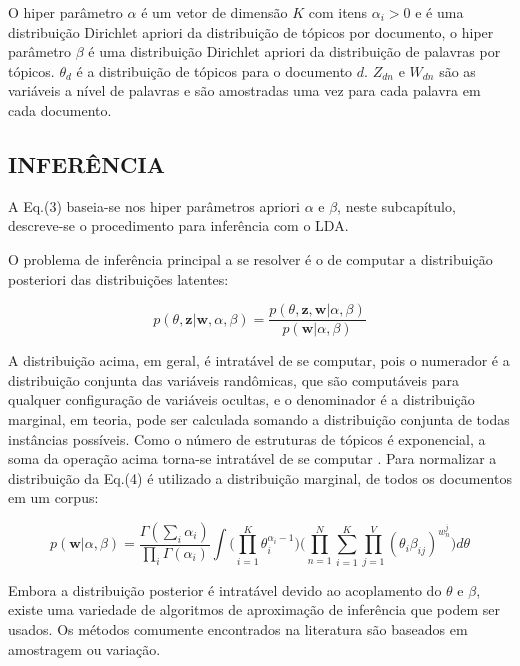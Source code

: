 \documentclass[12pt,a4paper]{article}
\begin{document}
O hiper parâmetro $\alpha$ é um vetor de dimensão $K$ com itens \(\alpha _i>0\) e é uma distribuição Dirichlet apriori da distribuição de tópicos por documento,
o hiper parâmetro $\beta$ é uma distribuição Dirichlet apriori da distribuição de palavras por tópicos. $\theta _d$ é a distribuição de tópicos para o documento $d$. $Z_{dn}$ e $W_{dn}$ são as variáveis a nível de palavras e são amostradas uma vez para cada palavra em cada documento.


\subsection{INFERÊNCIA} \label{sec:inferencia}
A Eq.(3) baseia-se nos hiper parâmetros apriori $\alpha$ e $\beta$, neste subcapítulo, descreve-se o procedimento para inferência com o LDA.

O problema de inferência principal a se resolver é o de  computar a distribuição posteriori das distribuições latentes:

\begin{equation}
p(\theta,\textbf{z}|\textbf{w},\alpha,\beta) = \frac{p(\theta,\textbf{z},\textbf{w}|\alpha,\beta)}{p(\textbf{w}|\alpha,\beta)}
\end{equation}

A distribuição acima, em geral, é intratável de se computar, pois o numerador é a distribuição conjunta das variáveis randômicas, que são computáveis para qualquer configuração de variáveis ocultas, e
 o denominador é a distribuição marginal, em teoria, pode ser calculada somando a distribuição conjunta de todas instâncias possíveis. Como o número de estruturas de tópicos é exponencial, a soma da operação acima torna-se intratável de se computar \cite{blei2012probabilistic}. Para normalizar a distribuição da Eq.(4) é utilizado a distribuição marginal,
 de todos os documentos em um corpus:

\begin{equation}
p(\textbf{w}|\alpha,\beta)=\frac{\Gamma(\sum_{i}\alpha_i)}{\prod_{i}\Gamma(\alpha_i)}\int{\Bigg(\prod_{i=1}^{K}\theta_i^{\alpha_i-1}\Bigg)} \Bigg(\prod_{n=1}^{N}\sum_{i=1}^{K}\prod_{j=1}^{V}(\theta_i\beta_{ij})^{w_n^j}\Bigg)d\theta
\end{equation}

Embora a distribuição posterior é intratável devido ao acoplamento do $\theta$ e $\beta$, existe uma variedade de algoritmos de aproximação de inferência que podem ser usados. Os métodos comumente encontrados na literatura são baseados em amostragem ou variação.
\end{document}
